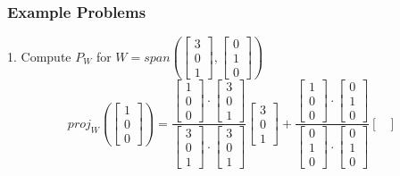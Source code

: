 \begin{enumerate}
\subsubsection{Example Problems}
1. Compute $P_W$ for $W = span(\begin{bmatrix} 3 \\ 0 \\ 1 \end{bmatrix}, 
\begin{bmatrix} 0 \\ 1\\ 0 \end{bmatrix})$
\[
  proj_W(\begin{bmatrix} 1 \\ 0 \\ 0 \end{bmatrix}) = 
  \frac{\begin{bmatrix} 1 \\ 0 \\ 0 \end{bmatrix} \cdot 
  \begin{bmatrix} 3 \\ 0 \\ 1 \end{bmatrix}}{\begin{bmatrix} 
3 \\ 0 \\ 1 \end{bmatrix} \cdot \begin{bmatrix} 
3 \\ 0 \\ 1 \end{bmatrix}} \begin{bmatrix} 3 \\ 0 \\ 1 \end{bmatrix} 
+ \frac{\begin{bmatrix} 1 \\ 0 \\ 0 \end{bmatrix} \cdot \begin{bmatrix}
0 \\ 1 \\ 0 \end{bmatrix}}{\begin{bmatrix}
0 \\ 1 \\ 0 \end{bmatrix} \cdot \begin{bmatrix}
0 \\ 1 \\ 0 \end{bmatrix}} \begin{bmatrix}

\end{bmatrix}\]
\end{enumerate}
